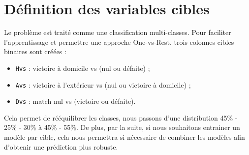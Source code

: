 \section{Définition des variables cibles}
\label{sec:labels}

Le problème est traité comme une classification multi-classes.
Pour faciliter l'apprentissage et permettre une approche One-vs-Rest,
trois colonnes cibles binaires sont créées :

\begin{itemize}
    \item \texttt{Hvs} : victoire à domicile vs (nul ou défaite) ;
    \item \texttt{Avs} : victoire à l'extérieur vs (nul ou victoire à domicile) ;
    \item \texttt{Dvs} : match nul vs (victoire ou défaite).
\end{itemize}

Cela permet de rééquilibrer les classes, nous passons d'une distribution 
45\% - 25\% - 30\% à 45\% - 55\%.
De plus, par la suite, si nous souhaitons entrainer un modèle par cible,
cela nous permettra si nécessaire de combiner les modèles afin
d'obtenir une prédiction plus robuste.







